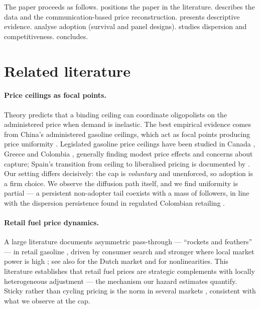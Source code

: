 \documentclass[11pt]{article}
\begin{document}
The paper proceeds as follows.
 positions the paper in the literature.
 describes the data and the communication-based price
reconstruction.  presents descriptive evidence.
 analyse adoption (survival and panel
designs).  studies dispersion and competitiveness.
 concludes.

\section{Related literature}
\label{sec:related}

\paragraph{Price ceilings as focal points.}
Theory predicts that a binding ceiling can coordinate oligopolists on the
administered price when demand is inelastic. The best empirical evidence
comes from China's administered gasoline ceilings, which act as focal
points producing price uniformity \parencite{zhang2020}. Legislated
gasoline price ceilings have been studied in Canada
\parencite{sen2011}, Greece \parencite{gatsios2026} and Colombia
\parencite{quiguanas2025}, generally finding modest price effects and
concerns about capture; Spain's transition from ceiling to liberalised
pricing is documented by \textcite{contin1999}. Our setting differs
decisively: the cap is \emph{voluntary} and unenforced, so adoption is a
firm choice. We observe the diffusion path itself, and we find uniformity
is partial --- a persistent non-adopter tail coexists with a mass of
followers, in line with the dispersion persistence found in regulated
Colombian retailing \parencite{quiguanas2025}.

\paragraph{Retail fuel price dynamics.}
A large literature documents asymmetric pass-through --- ``rockets and
feathers'' --- in retail gasoline \parencite{tappata2009}, driven by
consumer search \parencite{lewis2011} and stronger where local market
power is high \parencite{deltas2008, verlinda2008}; see also
\textcite{bettendorf2003} for the Dutch market and
\textcite{atil2013} for nonlinearities. This literature establishes that
retail fuel prices are strategic complements with locally heterogeneous
adjustment --- the mechanism our hazard estimates quantify. Sticky rather
than cycling pricing is the norm in several markets
\parencite{noel2007a,noel2007b,dehaas2024}, consistent with what we
observe at the cap.
\end{document}
